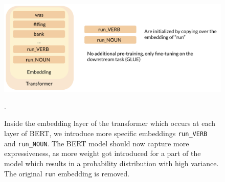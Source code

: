 \documentclass[a4paper,12pt,oneside,openright]{report}
\begin{document}
\begin{figure}
	\center
  \includegraphics[width=\linewidth]{./assets/experiments/pipeline_model_BERnie_POS_initialization.png}
  \caption{Inside the embedding layer of the transformer which occurs at each layer of BERT, we introduce more specific embeddings \texttt{run\_VERB} and \texttt{run\_NOUN}. The BERT model should now capture more expressiveness, as more weight got introduced for a part of the model which results in a probability distribution with high variance. The original \texttt{run} embedding is removed.}.
  \label{fig:BERnie_POS_initialization}
\end{figure}
\end{document}
